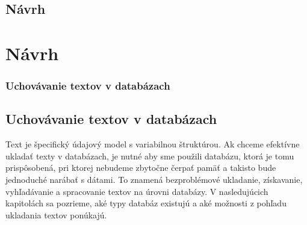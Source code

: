 \newpage
%
%
{
	\section{Návrh}
}
{
	\chapter{Návrh}
}
\label{section:design}

%
%
{
	\subsection{Uchovávanie textov v databázach}
}
{
	\section{Uchovávanie textov v databázach}
}
\label{subsection:persisting_texts_in_db}
Text je špecifický údajový model s variabilnou štruktúrou. Ak chceme efektívne ukladať texty v databázach, je nutné aby sme použili databázu, ktorá je tomu prispôsobená, pri ktorej nebudeme zbytočne čerpať pamäť a takisto bude jednoduché narábať s dátami. To znamená bezproblémové ukladanie, získavanie, vyhľadávanie a spracovanie textov na úrovni databázy. V nasledujúcich kapitolách sa pozrieme, aké typy databáz existujú a aké možnosti z pohľadu ukladania textov ponúkajú.

